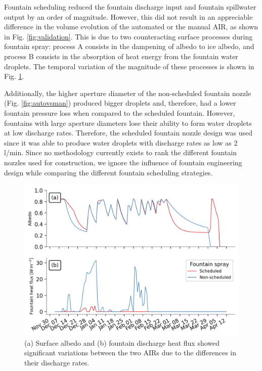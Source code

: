 Fountain scheduling reduced the fountain discharge input and fountain spillwater output by an order of
magnitude. However, this did not result in an appreciable difference in the volume evolution of the automated
or the manual \ac{AIR}, as shown in Fig. \ref{fig:validation}. This is due to two counteracting surface processes
during fountain spray: process A consists in the dampening of albedo to ice albedo, and process B consists in the
absorption of heat energy from the fountain water droplets. The temporal variation of the magnitude of these
processes is shown in Fig. \ref{fig:dis_processes}.

Additionally, the higher aperture diameter of the non-scheduled fountain nozzle (Fig. \ref{fig:autovsman}) produced
bigger droplets and, therefore, had a lower fountain pressure loss when compared to the scheduled fountain. 
However, fountains with large aperture diameters lose their ability to form water droplets at low discharge rates. 
Therefore, the scheduled fountain nozzle design was used since it was able to produce water droplets with discharge rates
as low as 2 l/min. Since no methodology currently exists to rank the different fountain nozzles used for
construction, we ignore the influence of fountain engineering design while comparing the different fountain
scheduling strategies.

\begin{figure}[htb]
	\includegraphics[width=\textwidth]{figs/dis_processes.png}
	\caption{(a) Surface albedo  and (b) fountain discharge heat flux showed significant variations between the two
		 \ac{AIRs} due to the differences in their discharge rates.}
	\label{fig:dis_processes}
\end{figure}

